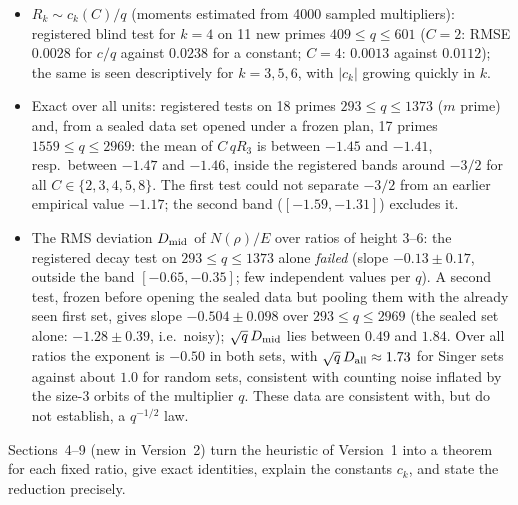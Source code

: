 \documentclass[11pt]{article}
\begin{document}
\begin{itemize}
\item $R_k\sim c_k(C)/q$ (moments estimated from 4000 sampled multipliers): registered blind test for $k=4$ on 11 new primes
$409\le q\le601$ ($C=2$: RMSE $0.0028$ for $c/q$ against $0.0238$ for a constant; $C=4$: $0.0013$ against $0.0112$); the same is seen
descriptively for $k=3,5,6$, with $|c_k|$ growing quickly in $k$.
\item Exact over all units: registered tests on 18 primes $293\le q\le1373$ ($m$ prime) and, from a sealed data set opened under a
frozen plan, 17 primes $1559\le q\le2969$: the mean of $C\,qR_3$ is between $-1.45$ and $-1.41$, resp.\ between $-1.47$ and $-1.46$,
inside the registered bands around $-3/2$ for all $C\in\{2,3,4,5,8\}$. The first test could not separate $-3/2$ from an earlier
empirical value $-1.17$; the second band ($[-1.59,-1.31]$) excludes it.
\item The RMS deviation $D_{\rm mid}$ of $N(\rho)/E$ over ratios of height $3$--$6$: the registered decay test on $293\le q\le1373$
alone \emph{failed} (slope $-0.13\pm0.17$, outside the band $[-0.65,-0.35]$; few independent values per $q$). A second test, frozen
before opening the sealed data but pooling them with the already seen first set, gives slope $-0.504\pm0.098$ over $293\le q\le2969$
(the sealed set alone: $-1.28\pm0.39$, i.e.\ noisy); $\sqrt q\,D_{\rm mid}$ lies between $0.49$ and $1.84$. Over all ratios the exponent is $-0.50$ in both
sets, with $\sqrt q\,D_{\rm all}\approx1.73$ for Singer sets against about $1.0$ for random sets, consistent with counting noise
inflated by the size-3 orbits of the multiplier $q$. These data are consistent with, but do not establish, a $q^{-1/2}$ law.
\end{itemize}
Sections~4--9 (new in Version~2) turn the heuristic of Version~1 into a theorem for each fixed ratio, give exact identities,
explain the constants $c_k$, and state the reduction precisely.
\end{document}
